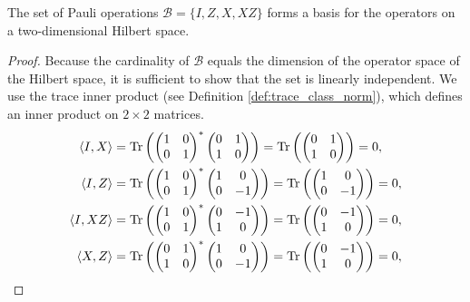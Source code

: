 \begin{theorem}
\label{thm:pauli_is_a_base}
The set of Pauli operations $\mathcal{B} = \{I, Z, X, XZ\}$ forms a basis for the operators on a two-dimensional Hilbert space.
\begin{proof}
Because the cardinality of $\mathcal{B}$ equals the dimension of the operator space of the Hilbert space, it is sufficient to show that the set is linearly independent. We use the trace inner product (see Definition \ref{def:trace_class_norm}), which defines an inner product on $2\times 2$ matrices.
\begin{align*}
\left\langle I, X \right\rangle &= \Tr\left( \begin{pmatrix}1 & 0 \\0 & 1\end{pmatrix}^* \begin{pmatrix}0 & 1 \\1 & 0\end{pmatrix} \right) = \Tr\left(\begin{pmatrix}0 & 1 \\1 & 0\end{pmatrix}\right) = 0, \\
\left\langle I, Z \right\rangle &= \Tr\left( \begin{pmatrix}1 & 0 \\0 & 1\end{pmatrix}^* \begin{pmatrix}1 & 0 \\0 & -1\end{pmatrix} \right) = \Tr\left(\begin{pmatrix}1 & 0 \\0 & -1\end{pmatrix}\right) = 0, \\
\left\langle I, XZ \right\rangle &= \Tr\left( \begin{pmatrix}1 & 0 \\0 & 1\end{pmatrix}^* \begin{pmatrix}0 & -1 \\1 & 0\end{pmatrix} \right) = \Tr\left(\begin{pmatrix}0 & -1 \\1 & 0\end{pmatrix}\right) = 0, \\
\left\langle X, Z \right\rangle &= \Tr\left( \begin{pmatrix}0 & 1 \\1 & 0\end{pmatrix}^* \begin{pmatrix}1 & 0 \\0 & -1\end{pmatrix} \right) = \Tr\left(\begin{pmatrix}0 & -1 \\1 & 0\end{pmatrix}\right) = 0, \\

\end{align*}
\end{proof}
\end{theorem}
